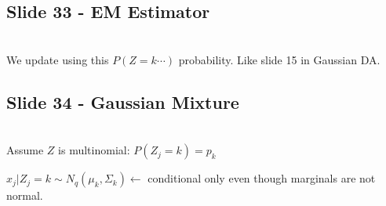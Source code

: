 \subsection{Slide 33 - EM Estimator}\hfill\\
\noindent We update using this $P(Z=k\cdots)$ probability. Like slide 15 in Gaussian DA.
\par\bigskip
\subsection{Slide 34 - Gaussian Mixture}\hfill\\
\noindent Assume $Z$ is multinomial: $P(Z_j=k) = p_k$\par
$x_j|Z_j=k\sim N_q(\mu_k,\Sigma_k)\leftarrow$ conditional only even though marginals are not normal. 

